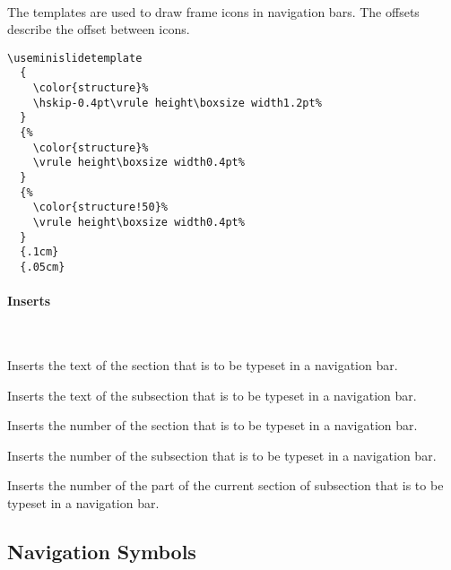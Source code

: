 \begin{command}{\useminislidetemplate%
    \\%
    }
  The templates are used to draw frame icons in navigation bars. The
  offsets describe the offset between icons.
  \example
\begin{verbatim}
\useminislidetemplate
  {
    \color{structure}%
    \hskip-0.4pt\vrule height\boxsize width1.2pt%
  }  
  {%
    \color{structure}%
    \vrule height\boxsize width0.4pt%
  }
  {%
    \color{structure!50}%
    \vrule height\boxsize width0.4pt%
  }
  {.1cm}
  {.05cm}
\end{verbatim}
\end{command}


\paragraph{Inserts}\


\begin{command}{\insertsectionhead}
  Inserts the text of the section that is to be typeset in a
  navigation bar.
\end{command}

\begin{command}{\insertsubsectionhead}
  Inserts the text of the subsection that is to be typeset in a
  navigation bar. 
\end{command}

\begin{command}{\insertsectionheadnumber}
  Inserts the number of the section that is to be typeset in a
  navigation bar. 
\end{command}

\begin{command}{\insertsubsectionheadnumber}
  Inserts the number of the subsection that is to be typeset in a
  navigation bar. 
\end{command}

\begin{command}{\insertpartheadnumber}
  Inserts the number of the part of the current section of subsection
  that is to be typeset in a navigation bar. 
\end{command}





\subsection{Navigation Symbols}
\label{section-navigation-symbols-template}

